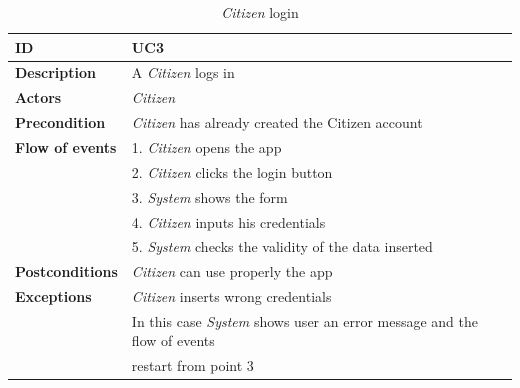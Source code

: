 \documentclass{article}
\begin{document}
\clearpage
\begin{table}
    \begin{center}
    \centering
\begin{tabular}{ | l | l |}
\hline
\textbf{ID} & UC3 \\
\hline
\textbf{Description} & A \textit{Citizen} logs in  \\
\hline
\textbf{Actors} & \textit{Citizen} \\
\hline
\textbf{Precondition} & \textit{Citizen} has already created the Citizen account \\
\hline
\textbf{Flow of events} & 1. \textit{Citizen} opens the app \\
                        & 2. \textit{Citizen} clicks the login button  \\
                        & 3. \textit{System} shows the form \\
                        & 4. \textit{Citizen} inputs his credentials  \\
                        & 5. \textit{System} checks the validity of the data inserted \\
\hline
\textbf{Postconditions} & \textit{Citizen} can use properly the app   \\
\hline
\textbf{Exceptions} & \textit{Citizen} inserts wrong credentials \\
                    & In this case \textit{System} shows user an error message and the flow of events  \\
                    & restart from point 3\\  
\hline
\end{tabular}
\caption{\textit{Citizen} login}
\end{center}
\end{table}
\end{document}
